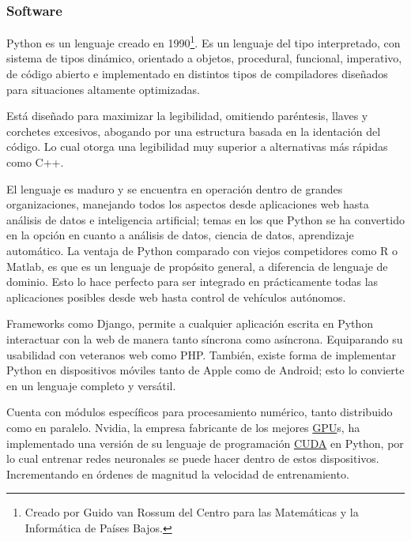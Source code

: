 


\subsubsection{Software}

Python es un lenguaje creado en 1990\footnote{Creado por Guido van Rossum del
Centro para las Matemáticas y la Informática de Países Bajos.}. Es un lenguaje
del tipo interpretado, con sistema de tipos dinámico, orientado a objetos,
procedural, funcional, imperativo, de código abierto e implementado en distintos
tipos de compiladores diseñados para situaciones altamente optimizadas.

Está diseñado para maximizar la legibilidad, omitiendo paréntesis, llaves y
corchetes excesivos, abogando por una estructura basada en la identación del
código. Lo cual otorga una legibilidad muy superior a alternativas más rápidas
como C++. 

El lenguaje es maduro y se encuentra en operación dentro de grandes
organizaciones, manejando todos los aspectos desde aplicaciones web hasta
análisis de datos e inteligencia artificial; temas en los que Python se ha
convertido en la opción en cuanto a análisis de datos, ciencia de datos,
aprendizaje automático. La ventaja de Python comparado con viejos competidores
como R o Matlab, es que es un lenguaje de propósito general, a diferencia de
lenguaje de dominio. Esto lo hace perfecto para ser integrado en prácticamente
todas las aplicaciones posibles desde web hasta control de vehículos autónomos. 

Frameworks como Django, permite a cualquier aplicación escrita en Python
interactuar con la web de manera tanto síncrona como asíncrona. Equiparando su
usabilidad con veteranos web como PHP. También, existe forma de implementar
Python en dispositivos móviles tanto de Apple como de Android; esto lo convierte
en un lenguaje completo y versátil.

Cuenta con módulos específicos para procesamiento numérico, tanto distribuido
como en paralelo. Nvidia, la empresa fabricante de los mejores
\hyperlink{abbr}{GPU}s, ha implementado una versión de su lenguaje de
programación \hyperlink{abbr}{CUDA} en Python, por lo cual entrenar redes
neuronales se puede hacer dentro de estos dispositivos. Incrementando en órdenes
de magnitud la velocidad de entrenamiento.

